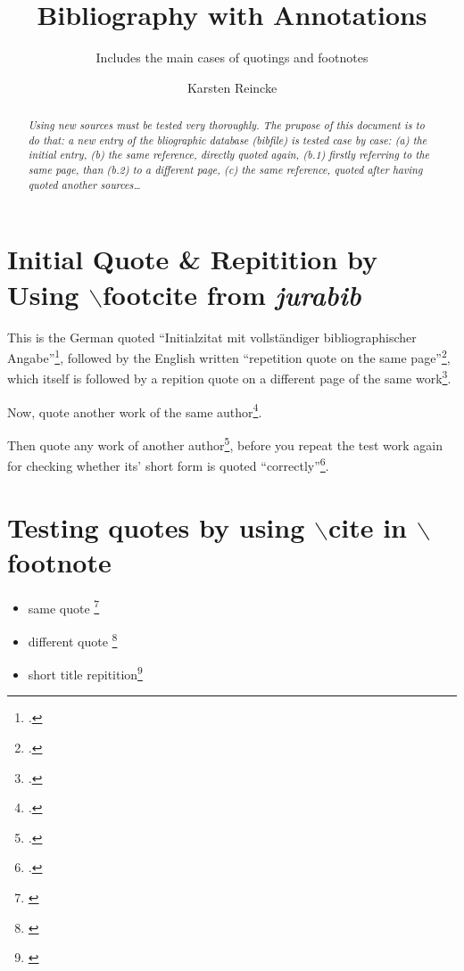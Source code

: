 \documentclass[
  DIV=calc,
  BCOR=5mm,
  11pt,
  smallheadings,
  oneside,
  abstract=true,
  toc=bib,
  ngerman,english]{scrartcl}
\begin{document}
\nocite{*}

\titlehead{Testing the Bibliography}
\subject{For evaluating \itshape{new bibliographic data}}
\title{Bibliography with Annotations}
\subtitle{Includes the main cases of quotings and footnotes}
\author{Karsten Reincke}
\maketitle

\begin{abstract}
\noindent \itshape
Using new sources must be tested very thoroughly. The prupose of this document
is to do that: a new entry of the bliographic database (bibfile) is tested case
by case: (a) the initial entry, (b) the same reference, directly quoted again,
(b.1) firstly referring to the same page, than (b.2) to a different page, (c)
the same reference, quoted after having quoted another sources\ldots
\end{abstract}
\footnotesize
\normalsize

\section{Initial Quote \& Repitition by Using $\backslash$footcite from
\emph{jurabib}}

This is the German quoted \foreignquote{german}{Initialzitat mit
vollständiger bibliographischer Angabe}\footcite[cf.][123pp]{Covey2006a}, followed by
the English written \foreignquote{english}{repetition quote on the same
page}\footcite[cf.][123ff]{Covey2006a}, which itself is followed by a
repition quote on a different page of the same
work\footcite[cf.][125p]{Covey2006a}.

Now, quote another work of the same author\footcite[cf.][321]{Covey2006a}.

Then quote any work of another author\footcite[cf.][42]{KantKdU1974}, before you
repeat the test work again for checking whether its' short form is quoted
\enquote{correctly}\footcite[cf.][123]{Covey2006a}.

\section{Testing quotes by using $\backslash$cite in $\backslash$footnote}

\begin{itemize}
  \item same quote \footnote{\cite[cf.][125]{Covey2006a}}
  \item different quote \footnote{\cite[cf.][42]{KantKdU1974}}
  \item short title repitition\footnote{\cite[cf.][125]{Covey2006a}}
\end{itemize}

\small

\end{document}
